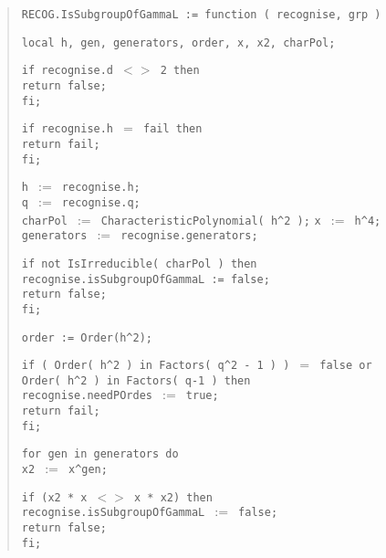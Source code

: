 \documentclass[a4paper,11pt]{article}
\theoremstyle{bla}
\begin{document}
\begin{quote}
  \hspace*{-0.3cm} \texttt{RECOG.IsSubgroupOfGammaL := function ( recognise, grp )}

  \texttt{local h, gen, generators, order, x, x2, charPol;}

  \texttt{if recognise.d $<>$ 2 then}\\
    \hspace*{0.3cm} \texttt{return false;}\\
  \texttt{fi;}

  \texttt{if recognise.h $=$ fail then}\\
    \hspace*{0.3cm} \texttt{return fail;}\\
  \texttt{fi;}

  \texttt{h $:=$ recognise.h;}\\
  \texttt{q $:=$ recognise.q;}\\
  \texttt{charPol $:=$ CharacteristicPolynomial( h\^{}2 );}
  \texttt{x $:=$ h\^{}4;}\\
  \texttt{generators $:=$ recognise.generators;}

  \texttt{if not IsIrreducible( charPol ) then}\\
    \hspace*{0.3cm} \texttt{recognise.isSubgroupOfGammaL := false;}\\
    \hspace*{0.3cm} \texttt{return false;}\\
  \texttt{fi;}

  \texttt{order := Order(h\^{}2);}

  \texttt{if ( Order( h\^{}2 ) in Factors( q\^{}2 - 1 ) ) $=$ false or}\\
  \texttt{Order( h\^{}2 ) in Factors( q-1 ) then}\\
    \hspace*{0.3cm} \texttt{recognise.needPOrdes $:=$ true;}\\
    \hspace*{0.3cm} \texttt{return fail;}\\
  \texttt{fi;}

  \texttt{for gen in generators do}\\
    \hspace*{0.3cm} \texttt{x2 $:=$ x\^{}gen;}

    \hspace*{0.3cm} \texttt{if (x2 * x $<>$ x * x2) then}\\
      \hspace*{0.6cm} \texttt{recognise.isSubgroupOfGammaL $:=$ false;}\\
      \hspace*{0.6cm} \texttt{return false;}\\
    \hspace*{0.3cm} \texttt{fi;}


\end{quote}
\end{document}
